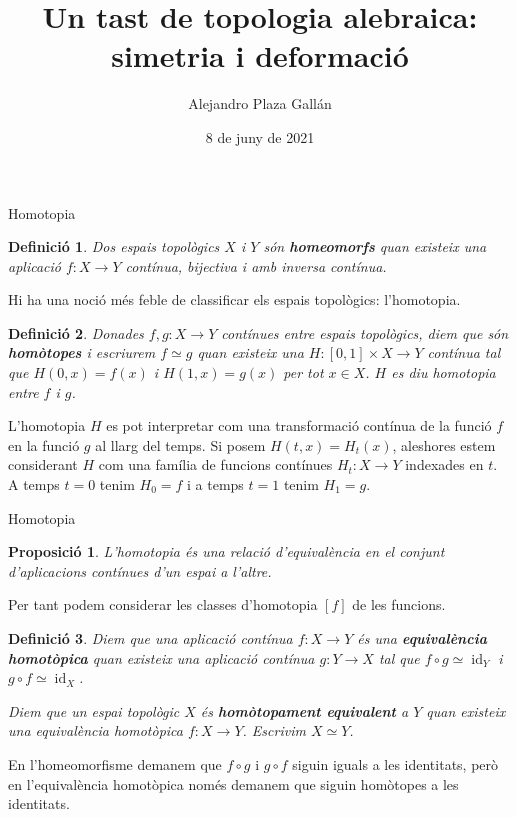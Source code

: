 \documentclass{beamer}
\title[Topologia algebraica]{Un tast de topologia alebraica: simetria i deformaci\'{o}}
\author{Alejandro Plaza Gall\'{a}n}
\date{8 de juny de 2021}
\newtheorem{definicio}{Definici\'{o}}
\newtheorem{proposicio}{Proposici\'{o}}
\theoremstyle{definition}
\DeclareMathOperator{\id}{id}
\begin{document}
\begin{frame}
\titlepage
\end{frame}

\begin{frame}{Homotopia}
\begin{definicio}
Dos espais topol\`{o}gics $X$ i $Y$ s\'{o}n \textbf{homeomorfs} quan existeix una aplicaci\'{o} $f:X\rightarrow Y$ cont\'{i}nua, bijectiva i amb inversa cont\'{i}nua.
\end{definicio}
\pause

Hi ha una noci\'{o} m\'{e}s feble de classificar els espais topol\`{o}gics: l'homotopia.
\pause

\begin{definicio}
Donades $f,g:X\rightarrow Y$ cont\'{i}nues entre espais topol\`{o}gics, diem que s\'{o}n \textbf{hom\`{o}topes} i escriurem $f\simeq g$ quan existeix una $H:[0,1]\times X\rightarrow Y$ cont\'{i}nua tal que $H(0,x)=f(x)$ i $H(1,x)=g(x)$ per tot $x\in X$. $H$ es diu homotopia entre $f$ i $g$.
\end{definicio}
\pause

L'homotopia $H$ es pot interpretar com una transformaci\'{o} cont\'{i}nua de la funci\'{o} $f$ en la funci\'{o} $g$ al llarg del temps. Si posem $H(t,x)=H_t(x)$, aleshores estem considerant $H$ com una fam\'{i}lia de funcions cont\'{i}nues $H_t:X\rightarrow Y$ indexades en $t$. A temps $t=0$ tenim $H_0=f$ i a temps $t=1$ tenim $H_1=g$.
\end{frame}

\begin{frame}{Homotopia}
\begin{proposicio}
L'homotopia \'{e}s una relaci\'{o} d'equival\`{e}ncia en el conjunt d'aplicacions cont\'{i}nues d'un espai a l'altre.
\end{proposicio}
\pause

Per tant podem considerar les classes d'homotopia $[f]$ de les funcions.
\pause

\begin{definicio}
Diem que una aplicaci\'{o} cont\'{i}nua $f:X\rightarrow Y$ \'{e}s una \textbf{equival\`{e}ncia homot\`{o}pica} quan existeix una aplicaci\'{o} cont\'{i}nua $g:Y\rightarrow X$ tal que $f\circ g\simeq\id_Y$ i $g\circ f\simeq\id_X$.

Diem que un espai topol\`{o}gic $X$ \'{e}s \textbf{hom\`{o}topament equivalent} a $Y$ quan existeix una equival\`{e}ncia homot\`{o}pica $f:X\rightarrow Y$. Escrivim $X\simeq Y$.
\end{definicio}
\pause

En l'homeomorfisme demanem que $f\circ g$ i $g\circ f$ siguin iguals a les identitats, per\`{o} en l'equival\`{e}ncia homot\`{o}pica nom\'{e}s demanem que siguin hom\`{o}topes a les identitats.
\end{frame}
\end{document}
